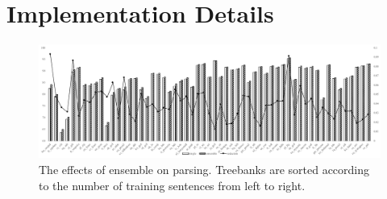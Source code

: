 \documentclass[11pt,a4paper]{article}
\begin{document}
\section{Implementation Details}
\begin{figure}[t]
	\includegraphics[width=\textwidth]{effects_elmo_ensemble}
	\caption{The effects of ensemble on parsing.
		Treebanks are sorted according to the number of training sentences from left to right.}\label{fig:elmo-effect-ens}
\end{figure}
\end{document}
